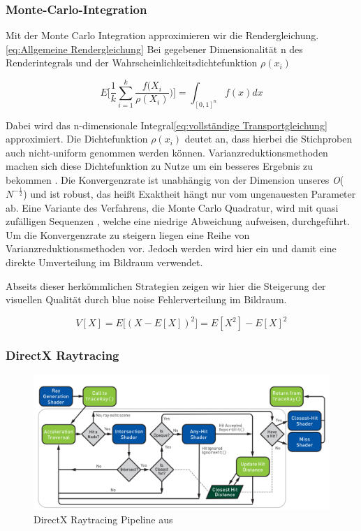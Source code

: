 \subsubsection{Monte-Carlo-Integration}
Mit der Monte Carlo Integration approximieren wir die Rendergleichung.\ref{eq:Allgemeine Rendergleichung} 
Bei gegebener Dimensionalität n des Renderintegrals und der 
Wahrscheinlichkeitsdichtefunktion $\rho(x_i)$
\cite{KK02}

\begin{equation}\label{eq:Monte-Carlo}
    E\biggl[\frac{1}{k}\sum_{i=1}^{k}\frac{f(X_{i}}{\rho(X_{i})})\biggl] = \int_{[0,1]^{n}}f(x)dx
\end{equation}

Dabei wird das n-dimensionale Integral\ref{eq:vollständige Transportgleichung} approximiert. Die Dichtefunktion $\rho(x_i)$ 
deutet an, dass hierbei die Stichproben auch nicht-uniform genommen werden können. 
Varianzreduktionsmethoden machen sich diese Dichtefunktion zu Nutze um 
ein besseres Ergebnis zu bekommen \cite{caflisch_1998}.
Die Konvergenzrate ist unabhängig von der Dimension unseres 
\textit{O}($N^{-\frac{1}{2}}$) und ist robust, das heißt Exaktheit hängt nur vom ungenauesten Parameter ab.
Eine Variante des Verfahrens, die Monte Carlo Quadratur, wird mit quasi zufälligen Sequenzen , 
welche eine niedrige Abweichung aufweisen, durchgeführt.
Um die Konvergenzrate zu steigern liegen eine Reihe von Varianzreduktionsmethoden vor. Jedoch werden wird hier 
ein  und damit eine direkte Umverteilung im Bildraum verwendet.

Abseits dieser herkömmlichen Strategien zeigen wir hier die Steigerung der 
visuellen Qualität durch blue noise Fehlerverteilung im Bildraum.

\begin{equation}\label{eq:Monte-Carlo-Varianz}
    V[X] = E\biggl[(X-E[X])^{2}\biggl] = E[X^{2}]
    - E[X]^{2}
\end{equation}

\subsubsection{DirectX Raytracing}

\begin{figure}[H]
    \centering
    \includegraphics[width=\linewidth]{content/PathTracer/Bilder/DirectXRaytracingPipeline.png}
    \caption{DirectX Raytracing Pipeline aus \cite{Haines2019}}
    \label{pic:DirectXRaytracingPipeline}
\end{figure}

